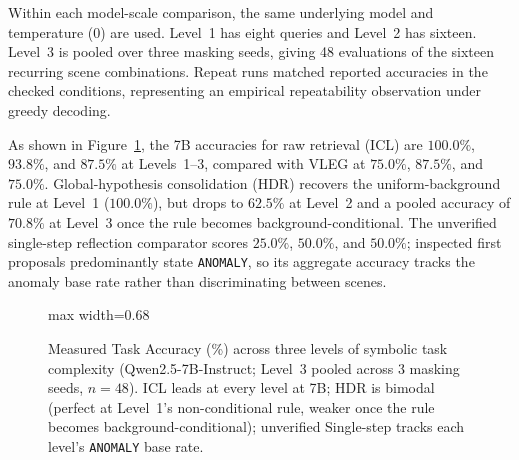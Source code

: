 \documentclass[10pt,a4paper,onecolumn]{article}
\theoremstyle{definition}
\theoremstyle{remark}
\begin{document}
Within each model-scale comparison, the same underlying model and temperature ($0$) are used. Level~1 has eight queries and Level~2 has sixteen. Level~3 is pooled over three masking seeds, giving 48 evaluations of the sixteen recurring scene combinations. Repeat runs matched reported accuracies in the checked conditions, representing an empirical repeatability observation under greedy decoding.

As shown in Figure~\ref{fig:exp1_results}, the 7B accuracies for raw retrieval (ICL) are $100.0\%$, $93.8\%$, and $87.5\%$ at Levels~1--3, compared with VLEG at $75.0\%$, $87.5\%$, and $75.0\%$. Global-hypothesis consolidation (HDR) recovers the uniform-background rule at Level~1 ($100.0\%$), but drops to $62.5\%$ at Level~2 and a pooled accuracy of $70.8\%$ at Level~3 once the rule becomes background-conditional. The unverified single-step reflection comparator scores $25.0\%$, $50.0\%$, and $50.0\%$; inspected first proposals predominantly state \texttt{ANOMALY}, so its aggregate accuracy tracks the anomaly base rate rather than discriminating between scenes.

\begin{figure}[!t]
    \centering
    \begin{adjustbox}{max width=0.68\linewidth}\end{adjustbox}
    \caption{Measured Task Accuracy (\%) across three levels of symbolic task complexity (Qwen2.5-7B-Instruct; Level~3 pooled across 3 masking seeds, $n=48$). ICL leads at every level at 7B; HDR is bimodal (perfect at Level~1's non-conditional rule, weaker once the rule becomes background-conditional); unverified Single-step tracks each level's \texttt{ANOMALY} base rate.}
    \label{fig:exp1_results}
\end{figure}
\end{document}
